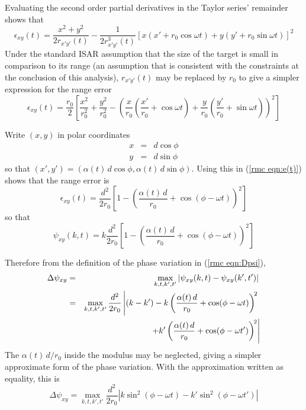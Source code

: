 Evaluating the second order partial derivatives in the Taylor series'
remainder shows that
\begin{equation}
\epsilon_{xy}(t)=\frac{x^2+y^2}{2r_{x'y'}(t)}-\frac{1}{2r_{x'y'}^3(t)}
\left[x(x'+r_0\cos\omega t)+y(y'+r_0\sin\omega t)\right]^2
\end{equation}
Under the standard ISAR assumption that the size of the target is small in 
comparison to its range (an assumption that is consistent with the
constraints at the conclusion of this analysis), $r_{x'y'}(t)$ may be
replaced by $r_0$ to give a simpler expression for the range error
\begin{equation}
\label{rmc eqn:e(t)}
\epsilon_{xy}(t)=\frac{r_0}{2}\left[
\frac{x^2}{r_0^2}+\frac{y^2}{r_0^2}-
\left(
	\frac{x}{r_0}\left(\frac{x'}{r_0}+\cos\omega t\right)
       +\frac{y}{r_0}\left(\frac{y'}{r_0}+\sin\omega t\right)
\right)^2\right]
\end{equation}

Write $(x,y)$ in polar coordinates
\begin{eqnarray}
x&=&d\cos\phi\\
y&=&d\sin\phi
\end{eqnarray}
so that $(x',y')=(\alpha(t)\,d\cos\phi,\alpha(t)\,d\sin\phi)$.  Using this
in (\ref{rmc eqn:e(t)}) shows that the range error is
\begin{equation}
\epsilon_{xy}(t)=\frac{d^2}{2r_0}\left[1-\left(\frac{\alpha(t)\,d}{r_0}
+\cos(\phi-\omega t)\right)^{\!2}\right]
\end{equation}
so that
\begin{equation}
\psi_{xy}(k,t)=k\frac{d^2}{2r_0}\left[1-\left(\frac{\alpha(t)\,d}{r_0}
+\cos(\phi-\omega t)\right)^{\!2}\right]
\end{equation}

Therefore from the definition of the phase variation in (\ref{rmc
eqn:Dpsi}),
\begin{eqnarray}
\Delta\psi_{xy}
&=&\max_{k,t,k',t'}\left|\psi_{xy}(k,t)-\psi_{xy}(k',t')\right|{\nonumber}\\
&=&\max_{k,t,k',t'}\frac{d^2}{2r_0}\left|
(k-k')-k\left(\frac{\alpha(t)\,d}{r_0}+\cos(\phi-\omega t)\right)^{\!2}
\right.{\nonumber}\\
&&{}\left.\qquad+k'\left(\frac{\alpha(t)\,d}{r_0}+\cos(\phi-\omega t')
\right)^{\!2}
\right|
\end{eqnarray}
The $\alpha(t)\,d/r_0$ inside the modulus may be neglected, giving a simpler
approximate form of the phase variation.  With the approximation written as
equality, this is
\begin{equation}
\Delta\psi_{xy}=\max_{k,t,k',t'}\frac{d^2}{2r_0} 
\left|k\sin^2\left(\phi-\omega t\right)
-k'\sin^2\left(\phi-\omega t'\right)\right|
\end{equation}

